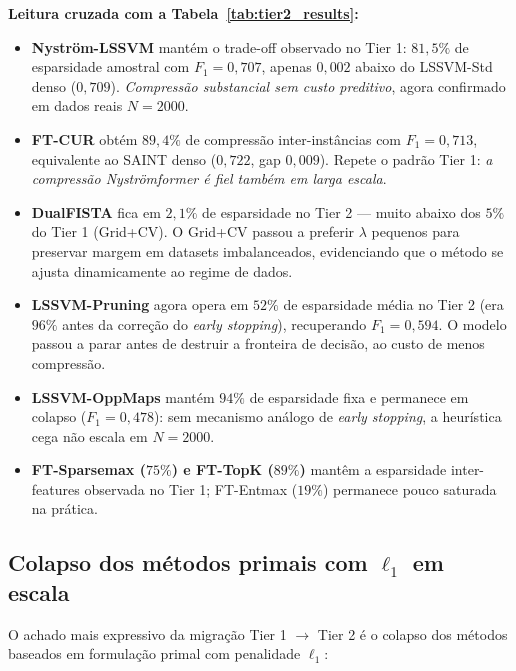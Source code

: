 \documentclass[12pt,a4paper]{article}
\begin{document}
\textbf{Leitura cruzada com a Tabela~\ref{tab:tier2_results}:}
\begin{itemize}
  \item \textbf{Nyström-LSSVM} mantém o trade-off observado no Tier 1:
        $81{,}5\%$ de esparsidade amostral com $F_1 = 0{,}707$, apenas
        $0{,}002$ abaixo do LSSVM-Std denso ($0{,}709$). \emph{Compressão
        substancial sem custo preditivo}, agora confirmado em dados reais
        $N=2000$.
  \item \textbf{FT-CUR} obtém $89{,}4\%$ de compressão inter-instâncias com
        $F_1 = 0{,}713$, equivalente ao SAINT denso ($0{,}722$, gap
        $0{,}009$). Repete o padrão Tier 1: \emph{a compressão Nyströmformer
        é fiel também em larga escala}.
  \item \textbf{DualFISTA} fica em $2{,}1\%$ de esparsidade no Tier 2 ---
        muito abaixo dos $5\%$ do Tier 1 (Grid+CV). O Grid+CV passou a preferir
        $\lambda$ pequenos para preservar margem em datasets imbalanceados,
        evidenciando que o método se ajusta dinamicamente ao regime de dados.
  \item \textbf{LSSVM-Pruning} agora opera em $52\%$ de esparsidade média
        no Tier 2 (era $96\%$ antes da correção do \emph{early stopping}),
        recuperando $F_1 = 0{,}594$. O modelo passou a parar antes de
        destruir a fronteira de decisão, ao custo de menos compressão.
  \item \textbf{LSSVM-OppMaps} mantém $94\%$ de esparsidade fixa e
        permanece em colapso ($F_1 = 0{,}478$): sem mecanismo análogo de
        \emph{early stopping}, a heurística cega não escala em $N=2000$.
  \item \textbf{FT-Sparsemax ($75\%$) e FT-TopK ($89\%$)} mantêm a
        esparsidade inter-features observada no Tier 1; FT-Entmax ($19\%$)
        permanece pouco saturada na prática.
\end{itemize}

\subsection{Colapso dos métodos primais com $\ell_1$ em escala}
\label{sec:tier2_primal_collapse}

O achado mais expressivo da migração Tier 1 $\to$ Tier 2 é o colapso dos
métodos baseados em formulação primal com penalidade $\ell_1$:
\end{document}
